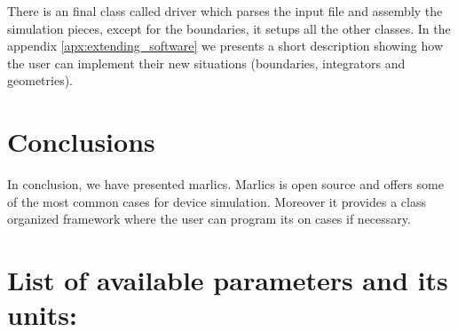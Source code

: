 \documentclass[final,5p,times,twocolumn]{elsarticle}
\begin{document}
There is an final class called driver which parses the input file and
assembly the simulation pieces, except for the boundaries, it setups
all the other classes.  In the appendix \ref{apx:extending_software}
we presents a short description showing how the user can implement
their new situations (boundaries, integrators and geometries). 


\section{Conclusions}

In conclusion, we have presented marlics. Marlics is open source and
offers some of the most common cases for device simulation. Moreover
it provides a class organized framework where the user can program its
on cases if necessary.  

\label{sec:conclusions}

 \appendix

\section{List of available parameters and its units:}
 \label{apx:list_of_parameters}
\end{document}

